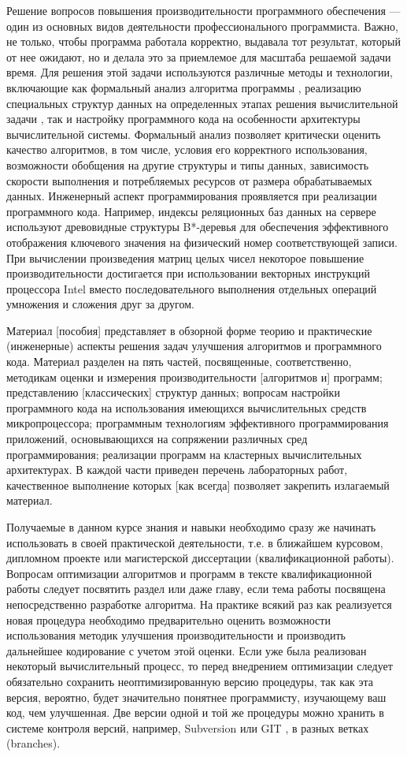 \documentclass[14pt, openany, twoside, draft]{extbook} %
\newcommand{\e}[2][fcolor]{\textcolor{pcolor}{[}\textcolor{#1}{#2}\textcolor{pcolor}{]}}
\begin{document}
Решение вопросов повышения производительности программного обеспечения
--- один из основных видов деятельности профессионального
программиста.  Важно, не только, чтобы программа работала корректно,
выдавала тот результат, который от нее ожидают, но и делала это за
приемлемое для масштаба решаемой задачи время.  Для решения этой
задачи используются различные методы и технологии, включающие как
формальный анализ алгоритма программы \cite{progproof}, реализацию
специальных структур данных на определенных этапах решения
вычислительной задачи \cite{algstruct}, так и настройку программного
кода на особенности архитектуры вычислительной системы.  Формальный
анализ позволяет критически оценить качество алгоритмов, в том числе,
условия его корректного использования, возможности обобщения на другие
структуры и типы данных, зависимость скорости выполнения и
потребляемых ресурсов от размера обрабатываемых данных.  Инженерный
аспект программирования проявляется при реализации программного кода.
Например, индексы реляционных баз данных на сервере используют
древовидные структуры B*-деревья для обеспечения эффективного
отображения ключевого значения на физический номер соответствующей
записи.  При вычислении произведения матриц целых чисел некоторое
повышение производительности достигается при использовании векторных
инструкций процессора Intel вместо последовательного выполнения
отдельных операций умножения и сложения друг за другом.

Материал \e{пособия} представляет в обзорной форме теорию и
практические (инженерные) аспекты решения задач улучшения алгоритмов и
программного кода.  Материал разделен на пять частей, посвященные,
соответственно, методикам оценки и измерения производительности
\e{алгоритмов и} программ; представлению \e{классических} структур
данных; вопросам настройки программного кода на использования
имеющихся вычислительных средств микропроцессора; программным
технологиям эффективного программирования приложений, основывающихся
на сопряжении различных сред программирования; реализации программ на
кластерных вычислительных архитектурах.  В каждой части приведен
перечень лабораторных работ, качественное выполнение которых \e{как
  всегда} позволяет закрепить излагаемый материал.

Получаемые в данном курсе знания и навыки необходимо сразу же начинать
использовать в своей практической деятельности, т.е. в ближайшем
курсовом, дипломном проекте или магистерской диссертации
(квалификационной работы).  Вопросам оптимизации алгоритмов и программ
в тексте квалификационной работы следует посвятить раздел или даже
главу, если тема работы посвящена непосредственно разработке
алгоритма.  На практике всякий раз как реализуется новая процедура
необходимо предварительно оценить возможности использования методик
улучшения производительности и производить дальнейшее кодирование с
учетом этой оценки.  Если уже была реализован некоторый вычислительный
процесс, то перед внедрением оптимизации следует обязательно сохранить
неоптимизированную версию процедуры, так как эта версия, вероятно,
будет значительно понятнее программисту, изучающему ваш код, чем
улучшенная.  Две версии одной и той же процедуры можно хранить в
системе контроля версий, например, Subversion \cite{svn} или GIT
\cite{git}, в разных ветках (branches).
\end{document}
